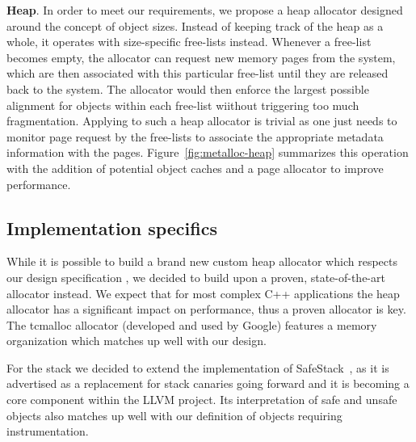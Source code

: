 \textbf{Heap}.
In order to meet our requirements, we propose a heap allocator designed around the concept of object sizes.
Instead of keeping track of the heap as a whole, it operates with size-specific free-lists instead.
Whenever a free-list becomes empty, the allocator can request new memory pages from the system, which are
then associated with this particular free-list until they are released back to the system. The allocator would then
enforce the largest possible alignment for objects within each free-list wiithout triggering too much
fragmentation. Applying \projectname{} to such a heap allocator is trivial as one just needs to monitor
page request by the free-lists to associate the appropriate metadata information with the pages. Figure~\ref{fig:metalloc-heap}
summarizes this operation with the addition of potential object caches and a page allocator to improve performance.

\subsection{Implementation specifics}
\label{sec:assumptions}

While it is possible to build a brand new custom heap allocator which respects our design specification
, we decided to build upon a proven, state-of-the-art allocator instead. We expect that for most
complex C++ applications the heap allocator has a significant impact
on performance, thus a proven allocator is key. The tcmalloc allocator 
(developed and used by Google) features a memory organization which matches up well with our design.

For the stack we decided to extend the implementation of SafeStack~\cite{kuznetsov2014cpi}, as it is advertised
as a replacement for stack canaries going forward and it is becoming a core component within the LLVM
project. Its interpretation of safe and unsafe objects also matches up well with our definition of objects
requiring instrumentation. 

